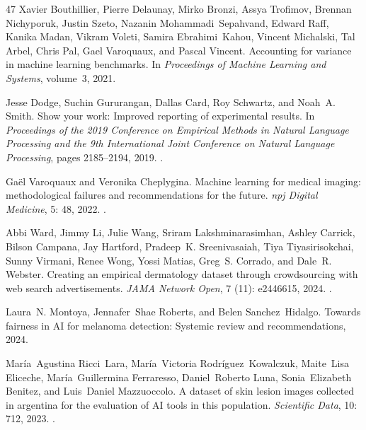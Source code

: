 \documentclass[11pt]{article}
\begin{document}
\begin{thebibliography}{47}
Xavier Bouthillier, Pierre Delaunay, Mirko Bronzi, Assya Trofimov, Brennan
  Nichyporuk, Justin Szeto, Nazanin Mohammadi~Sepahvand, Edward Raff, Kanika
  Madan, Vikram Voleti, Samira Ebrahimi~Kahou, Vincent Michalski, Tal Arbel,
  Chris Pal, Gael Varoquaux, and Pascal Vincent.
\newblock Accounting for variance in machine learning benchmarks.
\newblock In \emph{Proceedings of Machine Learning and Systems}, volume~3,
  2021.

Jesse Dodge, Suchin Gururangan, Dallas Card, Roy Schwartz, and Noah~A. Smith.
\newblock Show your work: Improved reporting of experimental results.
\newblock In \emph{Proceedings of the 2019 Conference on Empirical Methods in
  Natural Language Processing and the 9th International Joint Conference on
  Natural Language Processing}, pages 2185--2194, 2019.
\newblock {}.

Ga{\"e}l Varoquaux and Veronika Cheplygina.
\newblock Machine learning for medical imaging: methodological failures and
  recommendations for the future.
\newblock \emph{npj Digital Medicine}, 5: 48, 2022.
\newblock {}.

Abbi Ward, Jimmy Li, Julie Wang, Sriram Lakshminarasimhan, Ashley Carrick,
  Bilson Campana, Jay Hartford, Pradeep~K. Sreenivasaiah, Tiya Tiyasirisokchai,
  Sunny Virmani, Renee Wong, Yossi Matias, Greg~S. Corrado, and Dale~R.
  Webster.
\newblock Creating an empirical dermatology dataset through crowdsourcing with
  web search advertisements.
\newblock \emph{JAMA Network Open}, 7 (11): e2446615, 2024.
\newblock {}.

Laura~N. Montoya, Jennafer~Shae Roberts, and Belen Sanchez~Hidalgo.
\newblock Towards fairness in {AI} for melanoma detection: Systemic review and
  recommendations, 2024.

Mar{\'i}a~Agustina Ricci~Lara, Mar{\'i}a~Victoria Rodr{\'i}guez~Kowalczuk,
  Maite~Lisa Eliceche, Mar{\'i}a~Guillermina Ferraresso, Daniel~Roberto Luna,
  Sonia~Elizabeth Benitez, and Luis~Daniel Mazzuoccolo.
\newblock A dataset of skin lesion images collected in argentina for the
  evaluation of {AI} tools in this population.
\newblock \emph{Scientific Data}, 10: 712, 2023.
\newblock {}.


\end{thebibliography}
\end{document}
